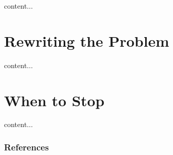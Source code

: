 \documentclass[10pt,compress,xcolor={usenames,dvipsnames}]{beamer} %
\begin{document}
\begin{frame}
	content...
\end{frame}


\section{Rewriting the Problem}

\begin{frame}
	content...
\end{frame}


\section{When to Stop}
\begin{frame}
	content...
\end{frame}


\begin{frame}[allowframebreaks]\frametitle{References}
	
\end{frame}
\end{document}
